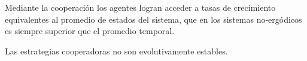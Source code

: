 \documentclass[a4paper,10pt]{article}
\begin{document}
Mediante la cooperación los agentes logran acceder a tasas de crecimiento equivalentes al promedio de estados del sistema, que en los sistemas no-ergódicos es siempre superior que el promedio  temporal.

Las estrategias cooperadoras no son evolutivamente estables.



{\footnotesize


}
\end{document}
